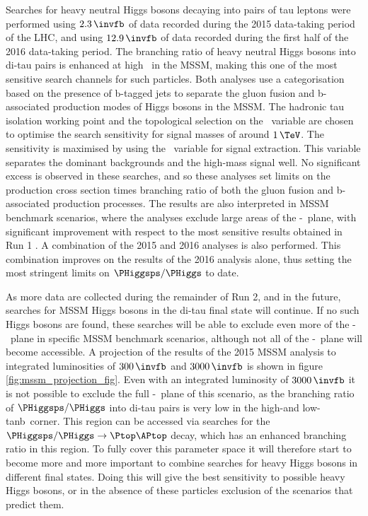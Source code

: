 Searches for heavy neutral Higgs bosons decaying into pairs of tau leptons were performed
using $2.3\,\invfb$ of data recorded during the 2015
data-taking period of the \ac{LHC}, and using $12.9\,\invfb$ of 
data recorded during the first half of the 2016 data-taking period. The 
branching ratio of heavy neutral Higgs bosons into di-tau pairs is enhanced at high \tanb~in the \ac{MSSM},
making this one of the most sensitive search channels for such particles. Both analyses use a categorisation 
based on the presence of b-tagged jets to separate
the gluon fusion and b-associated production modes of Higgs bosons in the \ac{MSSM}. 
The hadronic tau isolation working point and the topological selection on 
the \mT~variable are chosen to optimise the search sensitivity for signal
masses of around $1\,\TeV$.
The sensitivity is maximised by using the \mTtot~variable for signal extraction.
This variable separates the dominant backgrounds
and the high-mass signal well.
No significant excess is observed in these searches, and so 
these analyses set limits on the production cross section times branching ratio of both the
gluon fusion and b-associated production processes. The results are also
interpreted in \ac{MSSM} benchmark scenarios, where the analyses exclude large areas
of the \mA-\tanb~plane, with significant improvement with respect to the most sensitive
results obtained in Run 1 \cite{CMS-PAS-HIG-16-006,CMS-PAS-HIG-16-037}. A combination of the 2015 and 2016 analyses is also
performed. This combination improves on the results of the 2016 analysis alone, thus
setting the most stringent limits on $\PHiggsps/\PHiggs$ to date.

As more data are collected during the remainder of Run 2, and in the 
future, searches for \ac{MSSM} Higgs bosons in the di-tau final
state will continue. If no such Higgs bosons are found, these searches
will be able to exclude even more of the \mA-\tanb~plane in specific
\ac{MSSM} benchmark scenarios, although not all of the \mA-\tanb~plane
will become accessible. A projection of the results of the 2015 \ac{MSSM}
analysis to integrated luminosities of $300\,\invfb$ and $3000\,\invfb$ \cite{HTT-projection} is
shown in figure \ref{fig:mssm_projection_fig}. Even with an integrated luminosity of
$3000\,\invfb$ it is not possible to exclude the full \mA-\tanb~plane of this scenario,
as the branching ratio of $\PHiggsps/\PHiggs$ into di-tau pairs 
is very low in the high-\mA and low-tanb~corner. This region can be accessed 
via searches for the $\PHiggsps/\PHiggs \rightarrow \Ptop\APtop$ decay, which
has an enhanced branching ratio in this region. To fully cover this
parameter space it will therefore start to become more and more
important to combine searches for heavy Higgs bosons in different final states.
Doing this will give the best sensitivity to possible
heavy Higgs bosons, or in the absence of these particles exclusion
of the scenarios that predict them.

